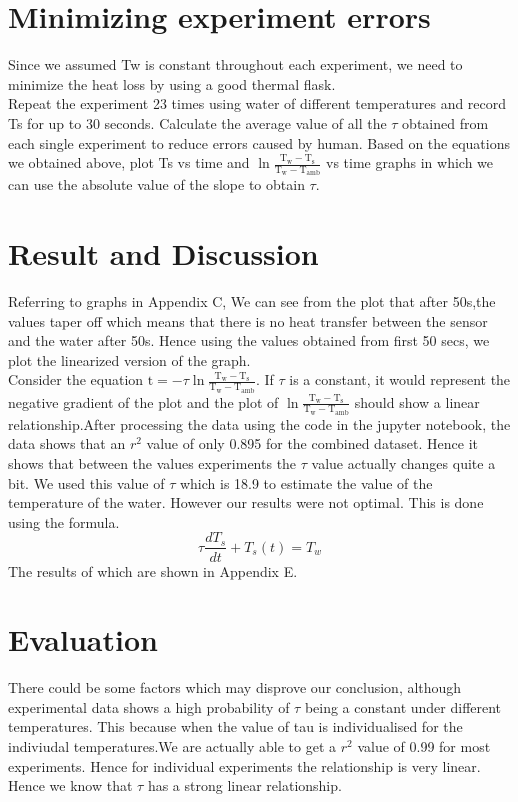 \documentclass[10pt]{article}
\begin{document}
\section{Minimizing experiment errors}
Since we assumed Tw is constant throughout each experiment, we need to minimize the heat loss by using a good thermal flask.\\
Repeat the experiment 23 times using water of different temperatures and record  Ts for up to 30 seconds. Calculate the average value of all the $\tau$ obtained from each single experiment to reduce errors caused by human. Based on the equations we obtained above, plot Ts  vs time and $\ln \frac{\mathrm{T}_{\mathrm{w}}-\mathrm{T}_{\mathrm{s}}}{\mathrm{T}_{\mathrm{w}}-\mathrm{T}_{\mathrm{amb}}}$  vs time graphs in which we can use the absolute value of the slope to 	obtain $\tau$.
\section{Result and Discussion}
Referring to graphs in Appendix C,
 We can see from the plot that after 50s,the values taper off  which means that there is no heat transfer between the sensor and the water after 50s. Hence using the values obtained from first 50 secs, we plot the linearized version of the graph.\\
Consider the equation $\mathrm{t}=-\tau \ln \frac{\mathrm{T}_{\mathrm{w}}-\mathrm{T}_{\mathrm{s}}}{\mathrm{T}_{\mathrm{w}}-\mathrm{T}_{\mathrm{amb}}}$. If $\tau$ is a constant, it would represent the negative gradient of the plot and the plot of $\ln \frac{\mathrm{T}_{\mathrm{w}}-\mathrm{T}_{\mathrm{s}}}{\mathrm{T}_{\mathrm{w}}-\mathrm{T}_{\mathrm{amb}}}$
should show a linear relationship.After processing the data using the code in the jupyter notebook, the data shows that an $r^2$ value of only 0.895 for the combined dataset. Hence it shows that between the values experiments the $\tau$ value actually changes quite a bit. We used this value of $\tau$ which is 18.9 to estimate the value of the temperature of the water. However our results were not optimal. This is done using the formula.
\begin{equation}
  \tau\frac{dT_s}{dt}+T_s(t)=T_w
\end{equation}
The results of which are shown in Appendix E.
\section{Evaluation}
There could be some factors which may disprove our conclusion, although experimental data shows a high probability of $\tau$ being a constant under different temperatures. This because when the value of tau is individualised for the indiviudal temperatures.We are actually able to get a $r^2$ value of 0.99 for most experiments. Hence for individual experiments the relationship is very linear. Hence we know that $\tau$ has a strong linear relationship.
\end{document}
